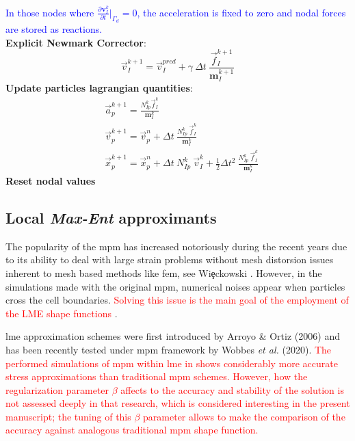 \documentclass[preprint,12pt,a4paper]{elsarticle}
\newcommand{\vect}[1]{
  \ensuremath{\mathbf{{#1}}}
}
\newcommand{\tens}[1]{
  \ensuremath{\mathbf{{#1}}}
}
\newcommand{\Deriv}[3][]{
  \ensuremath{\frac{\partial^{#1}{#2}}{ \partial {#3}^{#1} }}
}
\newcommand{\PNA}[1]{
  \textcolor{red}{{#1}}
}
\newcommand{\MMP}[1]{
  \textcolor{blue}{{#1}}
}
\begin{document}
\begin{algorithm}
\begin{algorithmic}[1]
    \MMP{In those nodes where $\Deriv{\vect{v}_I^{k}}{t} \big\rvert_{\Gamma_d} = 0$,
      the acceleration is fixed to zero and nodal forces are stored as
      reactions.}\\
    \STATE \textbf{Explicit Newmark Corrector}:
    \begin{equation*}
      \vec{v}_{I}^{k+1} = \vec{v}_{I}^{pred} + \gamma\ \Delta t\ \frac{\vec{f}_{I}^{k+1}}{\tens{m}_I^{k+1}}  
    \end{equation*}
    \STATE \textbf{Update particles lagrangian quantities}:
    \begin{align*}
      &\vec{a}_p^{k+1} = \frac{N_{Ip}^k\vec{f}_{I}^{k}}{\tens{m}_I^k}\\
      &\vec{v}_p^{k+1} = \vec{v}_p^n + \Delta t\
        \frac{N_{Ip}^k\
        \vec{f}_{I}^{k}}{\tens{m}_I^k}\\
      &\vec{x}_p^{k+1} = \vec{x}_p^n + \Delta t\
         N_{Ip}^k\ \vec{v}_{I}^{k} +
        \frac{1}{2}\Delta t^2\ \frac{N_{Ip}^k\
        \vec{f}_{I}^{k}}{\tens{m}_I^k}
    \end{align*}
    \STATE \textbf{Reset nodal values}
  \end{algorithmic}
\end{algorithm}

\subsection{Local \textit{Max-Ent} approximants}
\label{sec:local-max-ent}
The popularity of the \acrshort{mpm} has increased notoriously during
the recent years due to its ability to deal with large strain problems
without mesh distorsion issues inherent to mesh based methods like
\acrshort{fem}, see Wi{\c{e}}ckowski \cite{Wieckowski2004}. However, in the simulations
made with the original \acrshort{mpm}, numerical noises appear when particles
cross the cell boundaries.\PNA{Solving this issue is the main goal of the employment of the \acrshort{LME} shape functions}.

\acrfull{lme} approximation schemes were
first introduced by Arroyo \& Ortiz (2006)\cite{Arroyo2006} and has been
recently tested under \acrshort{mpm} framework by Wobbes {\it et al.}
(2020)\cite{Wobbes2020}.\PNA{The performed simulations of \acrshort{mpm}
within \acrshort{lme} in \cite{Wobbes2020} shows considerably more accurate stress
approximations than traditional \acrshort{mpm} schemes. However, 
how the regularization parameter $\beta$
affects to the accuracy and stability of the solution is not assessed deeply in that research, which is considered interesting in the present manuscript; the tuning of this $\beta$ parameter allows to make the comparison of the accuracy against analogous traditional \acrshort{mpm} shape function.} 
\end{document}
